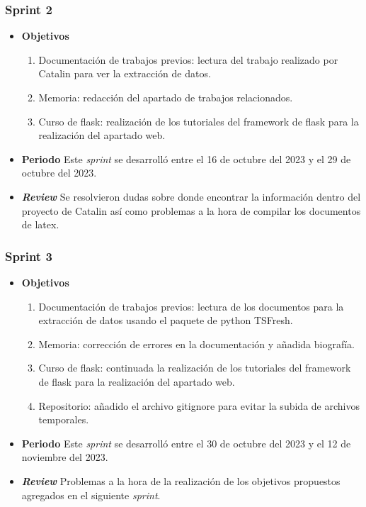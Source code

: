 \subsubsection{Sprint 2}
\begin{itemize}
\item \textbf{Objetivos}
\begin{enumerate}
\item Documentación de trabajos previos: lectura del trabajo realizado por Catalin para ver la extracción de datos.
\item Memoria: redacción del apartado de trabajos relacionados.
\item Curso de flask: realización de los tutoriales del framework de flask para la realización del apartado web.
\end{enumerate}
\item \textbf{Periodo}
Este \textsl{sprint} se desarrolló entre el 16 de octubre del 2023 y el 29 de octubre del 2023.
\item \textbf{\textsl{Review}}
Se resolvieron dudas sobre donde encontrar la información dentro del proyecto de Catalin así como problemas a la hora de compilar los documentos de latex. 


\end{itemize}
\subsubsection{Sprint 3}
\begin{itemize}
\item \textbf{Objetivos}
\begin{enumerate}
\item Documentación de trabajos previos: lectura de los documentos para la extracción de datos usando el paquete de python TSFresh.
\item Memoria: corrección de errores en la documentación y añadida biografía.
\item Curso de flask: continuada la realización de los tutoriales del framework de flask para la realización del apartado web.
\item Repositorio: añadido el archivo gitignore para evitar la subida de archivos temporales.
\end{enumerate}
\item \textbf{Periodo}
Este \textsl{sprint} se desarrolló entre el 30 de octubre del 2023 y el 12 de noviembre del 2023.
\item \textbf{\textsl{Review}}
Problemas a la hora de la realización de los objetivos propuestos agregados en el siguiente \textsl{sprint}. 


\end{itemize}

